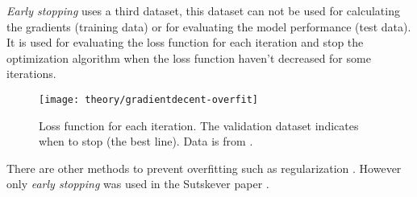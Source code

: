 \textit{Early stopping} uses a third dataset, this dataset can not be used for calculating the gradients (training data) or for evaluating the model performance (test data). It is used for evaluating the loss function for each iteration and stop the optimization algorithm when the loss function haven't decreased for some iterations. \cite{the-elements-of-statistical-learning, bishop, alexgraves}

\begin{figure}[h]
	\centering
	\texttt{[image: theory/gradientdecent-overfit]}
	\caption{Loss function for each iteration. The validation dataset indicates when to stop (the best line). Data is from \cite{alexgraves}.}
	\label{fig:theory:gradientdecent:overfit}
\end{figure}

There are other methods to prevent overfitting such as regularization \cite{the-elements-of-statistical-learning, bishop}. However only \textit{early stopping} was used in the Sutskever paper \cite{sutskever}.
